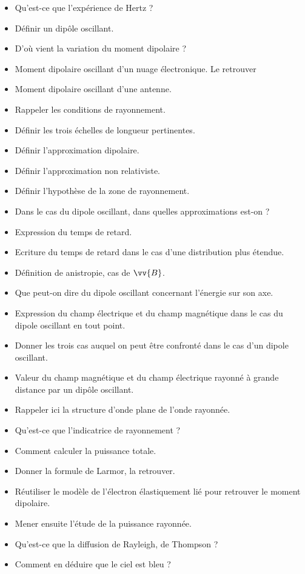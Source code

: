 \documentclass[a4paper, 11pt, hidelinks]{article}
\begin{document}
\begin{itemize}
    \item Qu'est-ce que l'expérience de Hertz ? \cite{Chapitre18}
    \item Définir un dipôle oscillant. \cite{Chapitre18}
    \item D'où vient la variation du moment dipolaire ? \cite{Chapitre18}
    \item Moment dipolaire oscillant d'un nuage électronique. Le retrouver \cite{Chapitre18}
    \item Moment dipolaire oscillant d'une antenne. \cite{Chapitre18}
    \item Rappeler les conditions de rayonnement. \cite{Chapitre18}
    \item Définir les trois échelles de longueur pertinentes. \cite{Chapitre18}
    \item Définir l'approximation dipolaire. \cite{Chapitre18}
    \item Définir l'approximation non relativiste. \cite{Chapitre18}
    \item Définir l'hypothèse de la zone de rayonnement. \cite{Chapitre18}
    \item Dans le cas du dipole oscillant, dans quelles approximations est-on ? \cite{Chapitre18}
    \item Expression du temps de retard. \cite{Chapitre18}
    \item Ecriture du temps de retard dans le cas d'une distribution plus étendue. \cite{Chapitre18}
    \item Définition de anistropie, cas de $\vv{B}$. \cite{Chapitre18}
    \item Que peut-on dire du dipole oscillant concernant l'énergie sur son axe. \cite{Chapitre18}
    \item Expression du champ électrique et du champ magnétique dans le cas du dipole oscillant en tout point. \cite{Chapitre18}
    \item Donner les trois cas auquel on peut être confronté dans le cas d'un dipole oscillant. \cite{Chapitre18}
    \item Valeur du champ magnétique et du champ électrique rayonné à grande distance par un dipôle oscillant. \cite{Chapitre18}
    \item Rappeler ici la structure d'onde plane de l'onde rayonnée. \cite{Chapitre18}
    \item Qu'est-ce que l'indicatrice de rayonnement ? \cite{Chapitre18}
    \item Comment calculer la puissance totale. \cite{Chapitre18}
    \item Donner la formule de Larmor, la retrouver. \cite{Chapitre18}
    \item Réutiliser le modèle de l'électron élastiquement lié pour retrouver le moment dipolaire. \cite{Chapitre18}
    \item Mener ensuite l'étude de la puissance rayonnée. \cite{Chapitre18}
    \item Qu'est-ce que la diffusion de Rayleigh, de Thompson ? \cite{Chapitre18}
    \item Comment en déduire que le ciel est bleu ? \cite{Chapitre18}
\end{itemize}
\end{document}
